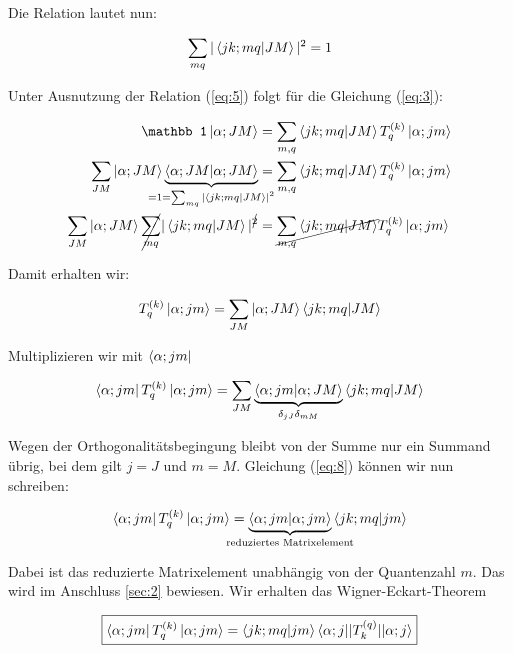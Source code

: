 Die Relation lautet nun:

\begin{equation}
  \label{eq:5}
  \sum_{mq}|\braket{jk;mq}{JM} |^2 = 1
\end{equation}

Unter Ausnutzung der Relation (\ref{eq:5}) folgt für die Gleichung (\ref{eq:3}):

\begin{align*}
  \label{eq:6}
   \mathbb 1 \ket{\alpha; JM} &=  \sum_{m,q} \braket{jk;mq}{JM} T^{(k)}_q  \ket{\alpha;jm} \\
 \sum_{JM} \ket{\alpha; JM}\underbr{\braket{\alpha; JM}{\alpha; JM}}_{=1=\sum_{mq}|\braket{jk;mq}{JM} |^2} &=  \sum_{m,q} \braket{jk;mq}{JM} T^{(k)}_q  \ket{\alpha;jm} \\
\sum_{JM}\ket{\alpha; JM} \cancel{\sum_{mq}}|\braket{jk;mq}{JM} |^{\cancel 2}   &= \cancel{\sum_{m,q} \braket{jk;mq}{JM}} T^{(k)}_q  \ket{\alpha;jm} 
\end{align*}

Damit erhalten wir:

\begin{equation}
  \label{eq:7}
   T^{(k)}_q  \ket{\alpha;jm} = \sum_{JM}\ket{\alpha; JM} \braket{jk;mq}{JM}
\end{equation}

Multiplizieren wir mit \(\left\langle \alpha;jm \right|\)

\begin{equation}
  \label{eq:8}
  \bra{\alpha;jm} T^{(k)}_q  \ket{\alpha;jm} = \sum_{JM} \underbr{\braket{\alpha;jm}{\alpha; JM}}_{\delta_{jJ}\delta_{mM}} \braket{jk;mq}{JM}
\end{equation}

Wegen der Orthogonalitätsbegingung bleibt von der Summe nur ein Summand übrig, bei dem gilt \(j=J\) und \(m=M\). Gleichung (\ref{eq:8}) können wir nun schreiben:

\begin{equation}
  \label{eq:9}
   \bra{\alpha;jm} T^{(k)}_q  \ket{\alpha;jm} = \underbr{\braket{\alpha;jm}{\alpha; jm}}_{\text{reduziertes Matrixelement}}  \braket{jk;mq}{jm}
\end{equation}

Dabei ist das reduzierte Matrixelement unabhängig von der Quantenzahl \(m\). Das wird im Anschluss \ref{sec:2} bewiesen. Wir erhalten das Wigner-Eckart-Theorem

\begin{equation}
  \label{eq:15}
\boxed{\bra{\alpha;jm} T^{(k)}_q  \ket{\alpha;jm} =  \braket{jk;mq}{jm} \langle \alpha;j || T^{(q)}_k || \alpha; j \rangle }
\end{equation}


